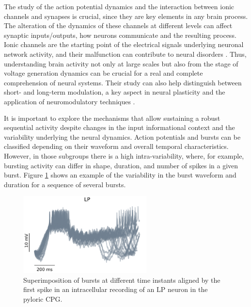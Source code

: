 The study of the action potential dynamics and the interaction between ionic channels and synapses is crucial, since they are key elements in any brain process. The alteration of the dynamics of these channels at different levels can affect synaptic inputs/outputs, how neurons communicate and the resulting process. Ionic channels are the starting point of the electrical signals underlying neuronal network activity, and their malfunction can contribute to neural disorders \parencite{kecskes_editorial_2023}. Thus, understanding brain activity not only at large scales but also from the stage of voltage generation dynamics can be crucial for a real and complete comprehension of neural systems. Their study can also help distinguish between short- and long-term modulation, a key aspect in neural plasticity and the application of neuromodulatory techniques \parencite{chambers_lightactivated_2008,burke_modulation_2019}.

 
It is important to explore the mechanisms that allow sustaining a robust sequential activity despite changes in the input informational context and the variability underlying the neural dynamics. Action potentials and bursts can be classified depending on their waveform and overall temporal characteristics. However, in those subgroups there is a high intra-variability, where, for example, bursting activity can differ in shape,  duration, and number of spikes in a given burst. Figure \ref{fig:burst variability} shows an example of the variability in the burst waveform and duration for a sequence of several bursts. 


\begin{figure}[htb!]
	\centering
	\includegraphics[width=0.6\textwidth]{img/intro/burst_variability.png}
	\caption{Superimposition of bursts at different time instants aligned by the first spike in an intracellular recording of an LP neuron in the pyloric CPG.}
	\label{fig:burst variability}
\end{figure}

